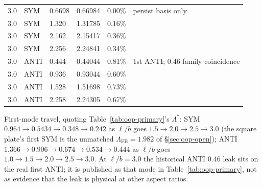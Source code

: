 \documentclass[11pt]{article}
\begin{document}
\begin{table}[!htbp]
\begin{minipage}[t]{0.49\textwidth}
\begin{tabularx}{\linewidth}{@{}rllrrX@{}}
3.0 & SYM  & 0.6698 & 0.66984 & 0.00\% & persist basis only \\
3.0 & SYM  & 1.320 & 1.31785 & 0.16\% & \\
3.0 & SYM  & 2.162 & 2.15417 & 0.36\% & \\
3.0 & SYM  & 2.256 & 2.24841 & 0.34\% & \\
3.0 & ANTI & 0.444 & 0.44044 & 0.81\% & 1st ANTI; $0.46$-family coincidence \\
3.0 & ANTI & 0.936 & 0.93044 & 0.60\% & \\
3.0 & ANTI & 1.528 & 1.51698 & 0.73\% & \\
3.0 & ANTI & 2.258 & 2.24305 & 0.67\% & \\
\bottomrule
\end{tabularx}
\end{minipage}
\end{table}
\FloatBarrier

First-mode travel, quoting Table~\ref{tab:oop-primary}'s $\Lambda^{*}$:
SYM $0.964\to 0.5434\to 0.348\to 0.242$ as $\ell/b$ goes
$1.5\to 2.0\to 2.5\to 3.0$ (the square plate's first SYM is the unmatched
$\Lambda_{\mathrm{FE}}=1.982$ of \S\ref{sec:oop-open}); ANTI
$1.366\to 0.906\to 0.674\to 0.534\to 0.444$ as $\ell/b$ goes
$1.0\to 1.5\to 2.0\to 2.5\to 3.0$. At $\ell/b=3.0$ the historical ANTI
$0.46$ leak sits on the real first ANTI; it is published as that mode
in Table~\ref{tab:oop-primary}, not as evidence that the leak is physical
at other aspect ratios.
\end{document}

